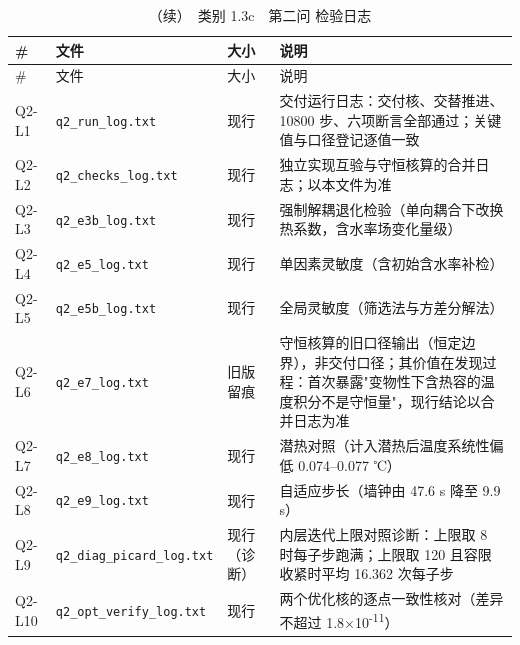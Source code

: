 \begin{longtable}{>{\centering\arraybackslash}m{\dimexpr 0.098\tblw\relax}>{\raggedright\arraybackslash}m{\dimexpr 0.225\tblw\relax}>{\centering\arraybackslash}m{\dimexpr 0.149\tblw\relax}>{\raggedright\arraybackslash}m{\dimexpr 0.528\tblw\relax}}
  \caption{（续）　类别 1.3c　第二问 检验日志}\label{tab:A-1-f}\\
  \toprule
    \# & 文件 & 大小 & 说明 \\
  \midrule
  \endfirsthead
  \toprule
    \# & 文件 & 大小 & 说明 \\
  \midrule
  \endhead
  \bottomrule
  \endfoot
  \bottomrule
  \endlastfoot
  Q2-L1 & \texttt{q2\_\allowbreak{}run\_\allowbreak{}log.\allowbreak{}txt} & 现行 & 交付运行日志：交付核、交替推进、10800 步、六项断言全部通过；关键值与口径登记逐值一致 \\
  Q2-L2 & \texttt{q2\_\allowbreak{}checks\_\allowbreak{}log.\allowbreak{}txt} & 现行 & 独立实现互验与守恒核算的合并日志；以本文件为准 \\
  Q2-L3 & \texttt{q2\_\allowbreak{}e3b\_\allowbreak{}log.\allowbreak{}txt} & 现行 & 强制解耦退化检验（单向耦合下改换热系数，含水率场变化量级） \\
  Q2-L4 & \texttt{q2\_\allowbreak{}e5\_\allowbreak{}log.\allowbreak{}txt} & 现行 & 单因素灵敏度（含初始含水率补检） \\
  Q2-L5 & \texttt{q2\_\allowbreak{}e5b\_\allowbreak{}log.\allowbreak{}txt} & 现行 & 全局灵敏度（筛选法与方差分解法） \\
  Q2-L6 & \texttt{q2\_\allowbreak{}e7\_\allowbreak{}log.\allowbreak{}txt} & 旧版留痕 & 守恒核算的旧口径输出（恒定边界），非交付口径；其价值在发现过程：首次暴露"变物性下含热容的温度积分不是守恒量"，现行结论以合并日志为准 \\
  Q2-L7 & \texttt{q2\_\allowbreak{}e8\_\allowbreak{}log.\allowbreak{}txt} & 现行 & 潜热对照（计入潜热后温度系统性偏低 0.074–0.077 ℃） \\
  Q2-L8 & \texttt{q2\_\allowbreak{}e9\_\allowbreak{}log.\allowbreak{}txt} & 现行 & 自适应步长（墙钟由 47.6 s 降至 9.9 s） \\
  Q2-L9 & \texttt{q2\_\allowbreak{}diag\_\allowbreak{}picard\_\allowbreak{}log.\allowbreak{}txt} & 现行（诊断） & 内层迭代上限对照诊断：上限取 8 时每子步跑满；上限取 120 且容限收紧时平均 16.362 次每子步 \\
  Q2-L10 & \texttt{q2\_\allowbreak{}opt\_\allowbreak{}verify\_\allowbreak{}log.\allowbreak{}txt} & 现行 & 两个优化核的逐点一致性核对（差异不超过 1.8×10\textsuperscript{-11}） \\

\end{longtable}
